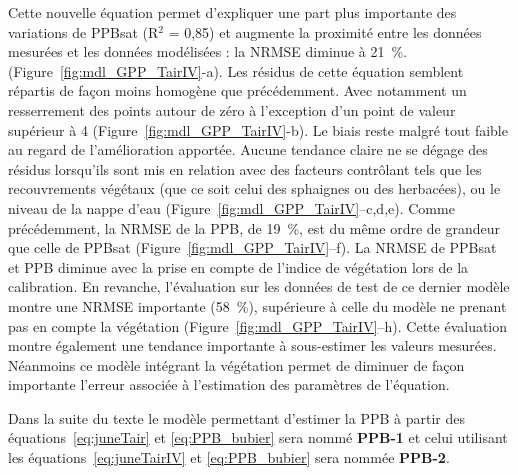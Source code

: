 Cette nouvelle équation permet d'expliquer une part plus importante des variations de PPBsat (R$^{2}$ = 0,85) et augmente la proximité entre les données mesurées et les données modélisées : la NRMSE diminue à \SI{21}{\percent}. (Figure~\ref{fig:mdl_GPP_TairIV}-a).
Les résidus de cette équation semblent répartis de façon moins homogène que précédemment.
Avec notamment un resserrement des points autour de zéro à l'exception d'un point de valeur supérieur à \num{4} (Figure~\ref{fig:mdl_GPP_TairIV}-b).
Le biais reste malgré tout faible au regard de l'amélioration apportée.
Aucune tendance claire ne se dégage des résidus lorsqu'ils sont mis en relation avec des facteurs contrôlant tels que les recouvrements végétaux (que ce soit celui des sphaignes ou des herbacées), ou le niveau de la nappe d'eau (Figure~\ref{fig:mdl_GPP_TairIV}--c,d,e).
Comme précédemment, la NRMSE de la PPB, de \SI{19}{\percent}, est du même ordre de grandeur que celle de PPBsat (Figure~\ref{fig:mdl_GPP_TairIV}--f).
La NRMSE de PPBsat et PPB diminue avec la prise en compte de l'indice de végétation lors de la calibration.
En revanche, l'évaluation sur les données de test de ce dernier modèle montre une NRMSE importante (\SI{58}{\percent}), supérieure à celle du modèle ne prenant pas en compte la végétation (Figure~\ref{fig:mdl_GPP_TairIV}--h).
Cette évaluation montre également une tendance importante à sous-estimer les valeurs mesurées.
Néanmoins ce modèle intégrant la végétation permet de diminuer de façon importante l'erreur associée à l'estimation des paramètres de l'équation.

Dans la suite du texte le modèle permettant d'estimer la PPB à partir des équations~\ref{eq:juneTair} et \ref{eq:PPB_bubier} sera nommé \textbf{PPB-1} et celui utilisant les équations~\ref{eq:juneTairIV} et \ref{eq:PPB_bubier} sera nommée \textbf{PPB-2}.


